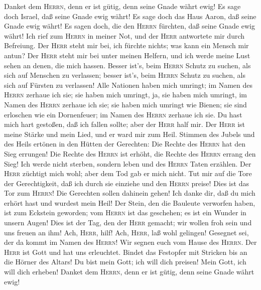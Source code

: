  Danket dem \textsc{Herrn}, denn er ist gütig, denn seine
Gnade währt ewig!  Es sage doch Israel, daß seine Gnade
ewig währt!  Es sage doch das Haus Aaron, daß seine Gnade
ewig währt!  Es sagen doch, die den \textsc{Herrn}
fürchten, daß seine Gnade ewig währt!  Ich rief zum
\textsc{Herrn} in meiner Not, und der \textsc{Herr} antwortete mir durch
Befreiung.  Der \textsc{Herr} steht mir bei, ich fürchte
nichts; was kann ein Mensch mir antun?  Der \textsc{Herr}
steht mir bei unter meinen Helfern, und ich werde meine Lust sehen an
denen, die mich hassen.  Besser ist's, beim \textsc{Herrn}
Schutz zu suchen, als sich auf Menschen zu verlassen; 
besser ist's, beim \textsc{Herrn} Schutz zu suchen, als sich auf Fürsten
zu verlassen!  Alle Nationen haben mich umringt; im Namen
des \textsc{Herrn} zerhaue ich sie;  sie haben mich
umringt, ja, sie haben mich umringt, im Namen des \textsc{Herrn} zerhaue
ich sie;  sie haben mich umringt wie Bienen; sie sind
erloschen wie ein Dornenfeuer; im Namen des \textsc{Herrn} zerhaue ich
sie.  Du hast mich hart gestoßen, daß ich fallen sollte;
aber der \textsc{Herr} half mir.  Der \textsc{Herr} ist
meine Stärke und mein Lied, und er ward mir zum Heil. 
Stimmen des Jubels und des Heils ertönen in den Hütten der Gerechten:
Die Rechte des \textsc{Herrn} hat den Sieg errungen!  Die
Rechte des \textsc{Herrn} ist erhöht, die Rechte des \textsc{Herrn}
errang den Sieg!  Ich werde nicht sterben, sondern leben
und des \textsc{Herrn} Taten erzählen.  Der \textsc{Herr}
züchtigt mich wohl; aber dem Tod gab er mich nicht.  Tut
mir auf die Tore der Gerechtigkeit, daß ich durch sie einziehe und den
\textsc{Herrn} preise!  Dies ist das Tor zum
\textsc{Herrn}! Die Gerechten sollen dahinein gehen!  Ich
danke dir, daß du mich erhört hast und wurdest mein Heil!
 Der Stein, den die Bauleute verworfen haben, ist zum
Eckstein geworden;  vom \textsc{Herrn} ist das geschehen;
es ist ein Wunder in unsern Augen!  Dies ist der Tag, den
der \textsc{Herr} gemacht; wir wollen froh sein und uns freuen an ihm!
 Ach, \textsc{Herr}, hilf! Ach, \textsc{Herr}, laß wohl
gelingen!  Gesegnet sei, der da kommt im Namen des
\textsc{Herrn}! Wir segnen euch vom Hause des \textsc{Herrn}.
 Der \textsc{Herr} ist Gott und hat uns erleuchtet.
Bindet das Festopfer mit Stricken bis an die Hörner des Altars!
 Du bist mein Gott; ich will dich preisen! Mein Gott, ich
will dich erheben!  Danket dem \textsc{Herrn}, denn er
ist gütig, denn seine Gnade währt ewig!

